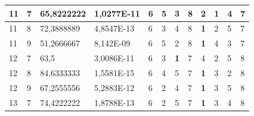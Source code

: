 \documentclass[conference]{IEEEtran}
\begin{document}
\begin{table}[]
\begin{tabular}{|llll|llllllll|}
		\multicolumn{1}{|l|}{11}  & \multicolumn{1}{l|}{7}         & \multicolumn{1}{l|}{65,8222222}    & 1,0277E-11 & \multicolumn{1}{l|}{6}   & \multicolumn{1}{l|}{5}          & \multicolumn{1}{l|}{3}          & \multicolumn{1}{l|}{8}   & \multicolumn{1}{l|}{2}          & \multicolumn{1}{l|}{\textbf{1}} & \multicolumn{1}{l|}{4}          & 7                      \\ \hline
		\multicolumn{1}{|l|}{11}  & \multicolumn{1}{l|}{8}         & \multicolumn{1}{l|}{72,3888889}    & 4,8547E-13 & \multicolumn{1}{l|}{6}   & \multicolumn{1}{l|}{3}          & \multicolumn{1}{l|}{4}          & \multicolumn{1}{l|}{8}   & \multicolumn{1}{l|}{\textbf{1}} & \multicolumn{1}{l|}{2}          & \multicolumn{1}{l|}{5}          & 7                      \\ \hline
		\multicolumn{1}{|l|}{11}  & \multicolumn{1}{l|}{9}         & \multicolumn{1}{l|}{51,2666667}    & 8,142E-09  & \multicolumn{1}{l|}{6}   & \multicolumn{1}{l|}{5}          & \multicolumn{1}{l|}{2}          & \multicolumn{1}{l|}{8}   & \multicolumn{1}{l|}{\textbf{1}} & \multicolumn{1}{l|}{4}          & \multicolumn{1}{l|}{3}          & 7                      \\ \hline
		\multicolumn{1}{|l|}{12}  & \multicolumn{1}{l|}{7}         & \multicolumn{1}{l|}{63,5}          & 3,0086E-11 & \multicolumn{1}{l|}{6}   & \multicolumn{1}{l|}{3}          & \multicolumn{1}{l|}{\textbf{1}} & \multicolumn{1}{l|}{7}   & \multicolumn{1}{l|}{4}          & \multicolumn{1}{l|}{2}          & \multicolumn{1}{l|}{5}          & 8                      \\ \hline
		\multicolumn{1}{|l|}{12}  & \multicolumn{1}{l|}{8}         & \multicolumn{1}{l|}{84,6333333}    & 1,5581E-15 & \multicolumn{1}{l|}{6}   & \multicolumn{1}{l|}{4}          & \multicolumn{1}{l|}{5}          & \multicolumn{1}{l|}{7}   & \multicolumn{1}{l|}{\textbf{1}} & \multicolumn{1}{l|}{3}          & \multicolumn{1}{l|}{2}          & 8                      \\ \hline
		\multicolumn{1}{|l|}{12}  & \multicolumn{1}{l|}{9}         & \multicolumn{1}{l|}{67,2555556}    & 5,2883E-12 & \multicolumn{1}{l|}{6}   & \multicolumn{1}{l|}{2}          & \multicolumn{1}{l|}{4}          & \multicolumn{1}{l|}{7}   & \multicolumn{1}{l|}{\textbf{1}} & \multicolumn{1}{l|}{3}          & \multicolumn{1}{l|}{5}          & 8                      \\ \hline
		\multicolumn{1}{|l|}{13}  & \multicolumn{1}{l|}{7}         & \multicolumn{1}{l|}{74,4222222}    & 1,8788E-13 & \multicolumn{1}{l|}{6}   & \multicolumn{1}{l|}{2}          & \multicolumn{1}{l|}{5}          & \multicolumn{1}{l|}{7}   & \multicolumn{1}{l|}{\textbf{1}} & \multicolumn{1}{l|}{3}          & \multicolumn{1}{l|}{4}          & 8                      \\ \hline

\end{tabular}
\end{table}
\end{document}
